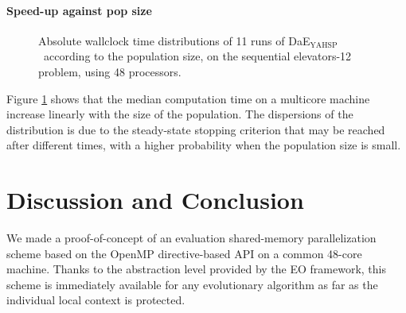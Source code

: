 \documentclass{sig-alternate}
\newcommand{\DAEYAHSP}{{\sc DaE$_{\text{YAHSP}}$}}
\begin{document}
\paragraph{Speed-up against pop size} %

\begin{figure}[htpb]
  \begin{center}
    \hfill
  \end{center}
  \caption{Absolute wallclock time distributions of 11 runs of \DAEYAHSP\ according to the population size, on the sequential elevators-12 problem, using 48 processors.}
  \label{fig:elevators_pop}
\end{figure}

Figure \ref{fig:elevators_pop} shows that the median computation time on a
multicore machine increase linearly with the size of the population. The 
dispersions of the distribution is due to the steady-state stopping criterion 
that may be reached after different times, with a higher probability when the
population size is small.

\section{Discussion and Conclusion}

We made a proof-of-concept of an evaluation shared-memory parallelization scheme based on the OpenMP directive-based API on a common 48-core machine.
Thanks to the abstraction level provided by the EO framework, this scheme is immediately available for any evolutionary algorithm as far as the individual local context is protected.
\end{document}
